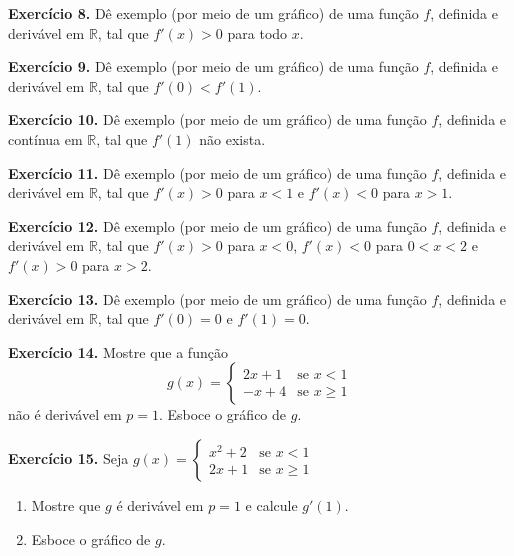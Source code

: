 \documentclass[12pt,a4paper]{article}
\begin{document}
\vspace{0.5cm}
\noindent\textbf{Exercício 8.} Dê exemplo (por meio de um gráfico) de uma função $f$, definida e derivável em $\mathbb{R}$, tal que $f'(x) > 0$ para todo $x$.

\vspace{0.5cm}
\noindent\textbf{Exercício 9.} Dê exemplo (por meio de um gráfico) de uma função $f$, definida e derivável em $\mathbb{R}$, tal que $f'(0) < f'(1)$.

\vspace{0.5cm}
\noindent\textbf{Exercício 10.} Dê exemplo (por meio de um gráfico) de uma função $f$, definida e contínua em $\mathbb{R}$, tal que $f'(1)$ não exista.

\vspace{0.5cm}
\noindent\textbf{Exercício 11.} Dê exemplo (por meio de um gráfico) de uma função $f$, definida e derivável em $\mathbb{R}$, tal que $f'(x) > 0$ para $x < 1$ e $f'(x) < 0$ para $x > 1$.

\vspace{0.5cm}
\noindent\textbf{Exercício 12.} Dê exemplo (por meio de um gráfico) de uma função $f$, definida e derivável em $\mathbb{R}$, tal que $f'(x) > 0$ para $x < 0$, $f'(x) < 0$ para $0 < x < 2$ e $f'(x) > 0$ para $x > 2$.

\vspace{0.5cm}
\noindent\textbf{Exercício 13.} Dê exemplo (por meio de um gráfico) de uma função $f$, definida e derivável em $\mathbb{R}$, tal que $f'(0) = 0$ e $f'(1) = 0$.

\vspace{0.5cm}
\noindent\textbf{Exercício 14.} Mostre que a função
\[
g(x) = \begin{cases} 
2x + 1 & \text{se } x < 1 \\ 
-x + 4 & \text{se } x \geq 1 
\end{cases}
\]
não é derivável em $p = 1$. Esboce o gráfico de $g$.

\vspace{0.5cm}
\noindent\textbf{Exercício 15.} Seja $g(x) = \begin{cases} x^2 + 2 & \text{se } x < 1 \\ 2x + 1 & \text{se } x \geq 1 \end{cases}$
\begin{enumerate}
    \renewcommand{\theenumi}{\alph{enumi}}
    \renewcommand{\labelenumi}{\theenumi)}
    \item Mostre que $g$ é derivável em $p = 1$ e calcule $g'(1)$.
    \item Esboce o gráfico de $g$.
\end{enumerate}
\end{document}
